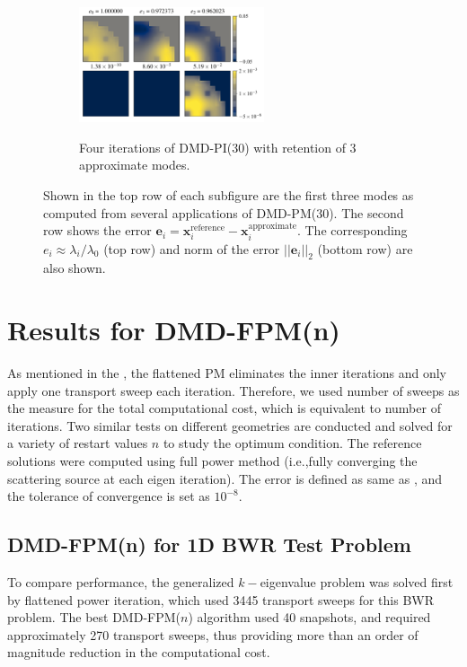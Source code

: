 \begin{figure}[!]
 \begin{subfigure}[b]{\textwidth}
  \centering
   \includegraphics[width=0.60\textwidth]{tex/figures/appx_modes_4_3.pdf}\\
   \caption{Four iterations of DMD-PI(30) with retention of 3 approximate modes.}
   \label{fig:appx_modes_4_3}
 \end{subfigure}
 \caption{Shown in the top row of each subfigure are the first three modes as computed from several applications of DMD-PM($30$).   The second row shows the error $\mathbf{e}_i = \mathbf{x}_i^{\text{reference}}-\mathbf{x}_i^{\text{approximate}}$.  The corresponding $e_i \approx \lambda_i/\lambda_0$ (top row) and norm of the error $||\mathbf{e}_i||_2$ (bottom row) are also shown.}
 \label{fig:appx_modes}
\end{figure}

\section{Results for DMD-FPM(n)}

As mentioned in the , the flattened PM eliminates the inner iterations and only apply one transport sweep each iteration.
Therefore, we used number of sweeps as the measure for the total computational cost, which is equivalent to number of iterations.
Two similar tests on different geometries are conducted and solved for a variety of restart values $n$ to study the optimum condition.
The reference solutions were computed using full power method (i.e.,fully converging the scattering source at each eigen iteration).
The error is defined as same as , and the tolerance of convergence is set as $10^{-8}$.

\subsection{DMD-FPM(n) for 1D BWR Test Problem}

To compare performance, the generalized $k-$eigenvalue problem was solved first by flattened power iteration, which used 3445 transport sweeps for this BWR problem.
The best DMD-FPM($n$) algorithm used 40 snapshots, and required approximately 270 transport sweeps, thus providing more than an order of magnitude reduction in the computational cost.

